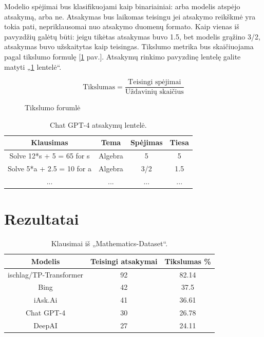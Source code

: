 \documentclass[conference]{IEEEtran}
\begin{document}
Modelio spėjimai bus klasifikuojami kaip binariainiai: arba modelis atspėjo atsakymą, arba ne.
Atsakymas bus laikomas teisingu jei atsakymo reikškmė yra tokia pati, nepriklausomai nuo atsakymo duomenų formato.
Kaip vienas iš pavyzdžių galėtų būti: jeigu tikėtas atsakymas buvo 1.5, bet modelis grąžino
3/2, atsakymas buvo užskaitytas kaip teisingas.
Tikslumo metrika bus skaičiuojama pagal tikslumo formulę [\ref{fig:tikslumas} pav.]. Atsakymų rinkimo pavyzdinę lentelę galite matyti „\ref{lentele:1} lentelė“.
\begin{figure}[ht]
\centering
\begin{equation}
\text{Tikslumas} = \frac{\text{Teisingi spėjimai}}{\text{Uždavinių skaičius}}
\end{equation}
\caption{Tikslumo forumlė}
\label{fig:tikslumas}
\end{figure}




\begin{table}[h!]
    \centering
    \caption{Chat GPT-4 atsakymų lentelė.}
    \label{lentele:1}
    \begin{tabular}{|c c c c|} 
     \hline
     Klausimas & Tema & Spėjimas & Tiesa  \\ [0.5ex] 
     \hline\hline
     Solve 12*s + 5 = 65 for s& Algebra & 5 & 5 \\ 
     \hline
    Solve 5*a + 2.5 = 10 for a & Algebra & 3/2 & 1.5 \\ 
     \hline
         ... & ... & ... & ... \\ 
     \hline
    \end{tabular}
    \end{table}

\section{Rezultatai}
\begin{table}[h!]
    \centering
    \caption{Klausimai iš „Mathematics-Dataset“.}
    \label{lentele:2}
    \begin{tabular}{|c c c|} 
     \hline
     Modelis & Teisingi atsakymai & Tikslumas \% \\ [0.5ex] 
     \hline\hline
     ischlag/TP-Transformer & 92 & 82.14 \\ 
     \hline
     Bing & 42 & 37.5 \\
     \hline
     iAsk.Ai & 41 & 36.61 \\
     \hline
     Chat GPT-4 & 30 & 26.78 \\
     \hline
     DeepAI & 27 & 24.11 \\
     \hline
    \end{tabular}
    \end{table}
\end{document}
